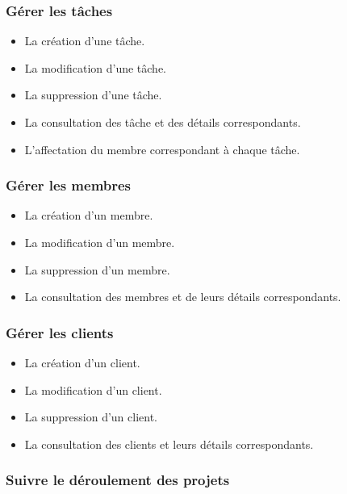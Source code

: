\subsubsection{G\'{e}rer les t\^{a}ches}

\begin{itemize}
\item{La cr\'{e}ation d'une t\^{a}che.}
\item{La modification d'une t\^{a}che.}
\item{La suppression d'une t\^{a}che.}
\item{La consultation  des t\^{a}che et des d\'{e}tails correspondants.}
\item{L'affectation du membre correspondant \`{a} chaque t\^{a}che.}
\end{itemize}

\subsubsection{G\'{e}rer les membres}

\begin{itemize}
\item{La cr\'{e}ation d'un membre.}
\item{La modification d'un membre.}
\item{La suppression d'un membre.}
\item{La consultation des membres et de leurs d\'{e}tails correspondants.}

\end{itemize}

\subsubsection{G\'{e}rer les clients}

\begin{itemize}
\item{La cr\'{e}ation d'un client.}
\item{La modification d'un client.}
\item{La suppression d'un client.}
\item{La consultation des clients et leurs d\'{e}tails correspondants.}
\end{itemize}

\subsubsection{
Suivre le d\'{e}roulement des projets}


